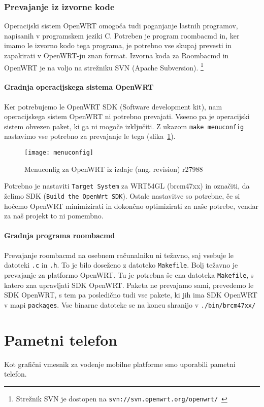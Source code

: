 \documentclass[a4paper, 12pt]{book}
\begin{document}
\subsection{Prevajanje iz izvorne kode}
Operacijski sistem OpenWRT omogoča tudi poganjanje lastnih programov, napisanih v programskem jeziki C. Potreben je program roombacmd in, ker imamo le izvorno kodo tega programa, je potrebno vse skupaj prevesti in zapakirati v OpenWRT-ju znan format. Izvorna koda za Roombacmd in OpenWRT je na voljo na strežniku SVN (Apache Subversion).
\footnote{Strežnik SVN  je dostopen na {\tt svn://svn.openwrt.org/openwrt/}~\cite{bibOpenWRT}}
\subsubsection{Gradnja operacijskega sistema OpenWRT}
Ker potrebujemo le OpenWRT SDK (Software development kit), nam operacijskega sistem OpenWRT ni potrebno prevajati. Vseeno pa je operacijski sistem obvezen paket, ki ga ni mogoče izključiti. Z ukazom {\tt make menuconfig}  nastavimo vse potrebno za prevajanje le tega (slika~\ref{picMenuconfig}). 

\begin{figure}[h]
	\centering
	\texttt{[image: menuconfig]}
	\caption{Menuconfig za OpenWRT iz izdaje (ang. revision) r27988}
	\label{picMenuconfig}
\end{figure}

Potrebno je nastaviti {\tt Target System} za WRT54GL (brcm47xx) in o\-zna\-či\-ti, da želimo SDK ({\tt Build the OpenWrt SDK}). Ostale nastavitve so potrebne, če si hočemo OpenWRT minimizirati in dokončno optimizirati za naše potrebe, vendar za naš projekt to ni pomembno.
\subsubsection{Gradnja programa roombacmd}
Prevajanje roombacmd na osebnem računalniku ni težavno, saj vsebuje le datoteki {\tt .c} in {\tt .h}. To je bilo doseženo z datoteko {\tt Makefile}. Bolj težavno je prevajanje za platformo OpenWRT. Tu je potrebna še ena datoteka {\tt Makefile}, s katero zna upravljati SDK OpenWRT. Paketa ne prevajamo sami, prevedemo le SDK OpenWRT, s tem pa posledično tudi vse pakete, ki jih ima SDK OpenWRT v mapi {\tt packages}. Vse binarne datoteke se na koncu shranijo v {\tt ./bin/brcm47xx/}

\chapter{Pametni telefon}
Kot grafični vmesnik za vodenje mobilne platforme smo uporabili pametni telefon. 
\end{document}
